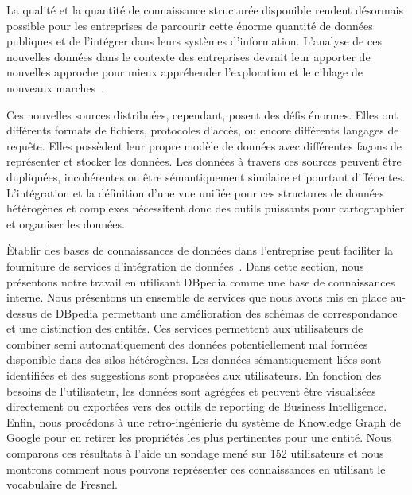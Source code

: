 La qualit\'{e} et la quantit\'{e} de connaissance structur\'{e}e disponible rendent d\'{e}sormais possible pour les entreprises de parcourir cette \'{e}norme quantit\'{e} de donn\'{e}es publiques et de l'int\'{e}grer dans leurs syst\`{e}mes d'information. L'analyse de ces nouvelles donn\'{e}es dans le contexte des entreprises devrait leur apporter de nouvelles approche pour mieux appr\'{e}hender l'exploration et le ciblage de nouveaux marches~\cite{LaValle:MIT:11}.

Ces nouvelles sources distribu\'{e}es, cependant, posent des d\'{e}fis \'{e}normes. Elles ont diff\'{e}rents formats de fichiers, protocoles d'acc\`{e}s, ou encore diff\'{e}rents langages de requête. Elles poss\`{e}dent leur propre mod\`{e}le de donn\'{e}es avec diff\'{e}rentes façons de repr\'{e}senter et stocker les donn\'{e}es. Les donn\'{e}es à travers ces sources peuvent être dupliqu\'{e}es, incoh\'{e}rentes ou être s\'{e}mantiquement similaire et pourtant diff\'{e}rentes. L'int\'{e}gration et la d\'{e}finition d'une vue unifi\'{e}e pour ces structures de donn\'{e}es h\'{e}t\'{e}rog\`{e}nes et complexes n\'{e}cessitent donc des outils puissants pour cartographier et organiser les donn\'{e}es.

\`{E}tablir des bases de connaissances de donn\'{e}es dans l'entreprise peut faciliter la fourniture de services d'int\'{e}gration de donn\'{e}es~\cite{Frischmuth:SemWebJorunal:12}. Dans cette section, nous pr\'{e}sentons notre travail en utilisant DBpedia comme une base de connaissances interne. Nous pr\'{e}sentons un ensemble de services que nous avons mis en place au-dessus de DBpedia permettant une am\'{e}lioration des sch\'{e}mas de correspondance et une distinction des entit\'{e}s. Ces services permettent aux utilisateurs de combiner semi automatiquement des donn\'{e}es potentiellement mal form\'{e}es disponible dans des silos h\'{e}t\'{e}rog\`{e}nes. Les donn\'{e}es s\'{e}mantiquement li\'{e}es sont identifi\'{e}es et des suggestions sont propos\'{e}es aux utilisateurs. En fonction des besoins de l'utilisateur, les donn\'{e}es sont agr\'{e}g\'{e}es et peuvent être visualis\'{e}es directement ou export\'{e}es vers des outils de reporting de Business Intelligence. Enfin, nous proc\'{e}dons à une retro-ing\'{e}nierie du syst\`{e}me de Knowledge Graph de Google pour en retirer les propri\'{e}t\'{e}s les plus pertinentes pour une entit\'{e}. Nous comparons ces r\'{e}sultats à l'aide un sondage men\'{e} sur 152 utilisateurs et nous montrons comment nous pouvons repr\'{e}senter ces connaissances en utilisant le vocabulaire de Fresnel.

